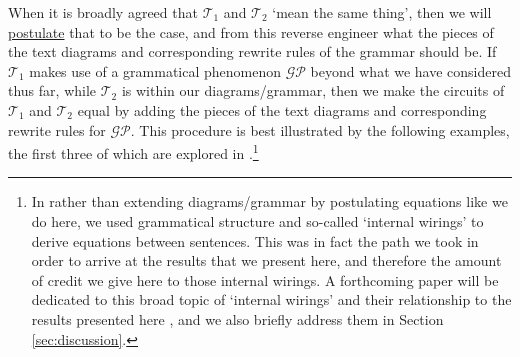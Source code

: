 When it is broadly agreed that $\mathcal{T}_1$ and $\mathcal{T}_2$ `mean the same thing',  then we will \underline{postulate} that to be the case, and from this reverse engineer what the pieces of the text diagrams and corresponding rewrite rules of the grammar should be.  If $\mathcal{T}_1$ makes use of a grammatical phenomenon $\mathcal{GP}$ beyond what we have considered thus far, while $\mathcal{T}_2$ is within our diagrams/grammar, then we make the circuits of $\mathcal{T}_1$ and $\mathcal{T}_2$ equal by adding  the pieces of the text diagrams and corresponding rewrite rules for $\mathcal{GP}$. This procedure is best illustrated by the following examples, the first three of which are explored in \cite{GramEqs}.\footnote{In \cite{GramEqs} rather than extending diagrams/grammar by postulating equations like we do here, we used grammatical structure and so-called `internal wirings' \cite{FrobMeanI, FrobMeanII, GrefSadr, KartsaklisSadrzadeh2014, CLM, CoeckeText, CoeckeMeich} to derive equations between sentences.  This was in fact the path we took in order to arrive at the results that we present here, and therefore the amount of credit we give here to those internal wirings.  A forthcoming paper will be dedicated to this broad topic of `internal wirings' and their relationship to the results presented here \cite{IntWire}, and we also briefly address them in Section \ref{sec:discussion}.}
 

